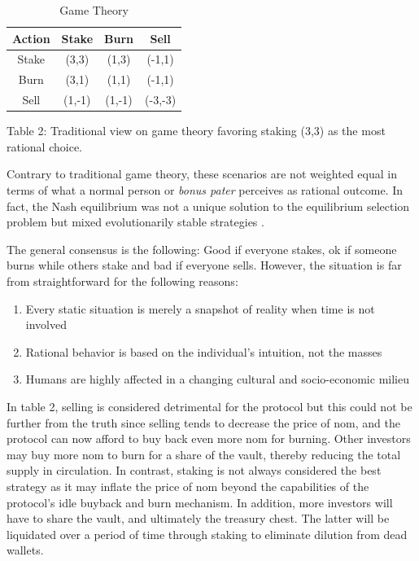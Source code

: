 \documentclass[12pt]{article}
\begin{document}
\begin{table}[ht]
\caption{Game Theory}
\centering
\begin{tabular}{||c| c| c| c||} 
 \hline
Action & Stake &  Burn & Sell \\ [0.5ex] 
 \hline\hline
Stake & (3,3) & (1,3) & (-1,1) \\ 
 \hline
Burn & (3,1) & (1,1) & (-1,1) \\
 \hline
Sell & (1,-1)& (1,-1) & (-3,-3) \\
 \hline
\end{tabular}
\label{Table 2}

Table 2: Traditional view on game theory favoring staking (3,3) as the most rational choice.
\end{table}

Contrary to traditional game theory, these scenarios are not weighted equal in terms of what a normal person or \textit{bonus pater} perceives as rational outcome. In fact, the Nash equilibrium was not a unique solution to the equilibrium selection problem but mixed evolutionarily stable strategies \cite{evogame}.

The general consensus is the following: Good if everyone stakes, ok if someone burns while others stake and bad if everyone sells. However, the situation is far from straightforward for the following reasons:

\begin{enumerate}[label=(\roman*)]

\item Every static situation is merely a snapshot of reality when time is not involved

\item  Rational behavior is based on the individual’s intuition, not the masses

\item  Humans are highly affected in a changing cultural and socio-economic milieu

\end{enumerate}

In table 2, selling is considered detrimental for the protocol but this could not be further from the truth since selling tends to decrease the price of nom, and the protocol can now afford to buy back even more nom for burning. Other investors may buy more nom to burn for a share of the vault, thereby reducing the total supply in circulation. In contrast, staking is not always considered the best strategy as it may inflate the price of nom beyond the capabilities of the protocol’s idle buyback and burn mechanism. In addition, more investors will have to share the vault, and ultimately the treasury chest. The latter will be liquidated over a period of time through staking to eliminate dilution from dead wallets.
\end{document}
